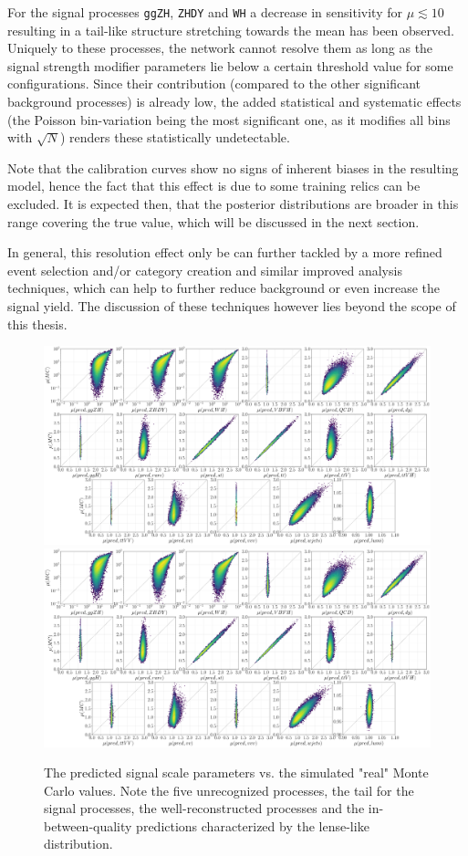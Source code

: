 For the signal processes \texttt{ggZH}, \texttt{ZHDY} and \texttt{WH} a decrease in sensitivity for $\mu\lesssim10$ resulting in a tail-like structure stretching towards the mean has been observed. Uniquely to these processes, the network cannot resolve them as long as the signal strength modifier parameters lie below a certain threshold value for some configurations. Since their contribution (compared to the other significant background processes) is already low, the added statistical and systematic effects (the Poisson bin-variation being the most significant one, as it modifies all bins with $\sqrt{N}$) renders these statistically undetectable.

Note that the calibration curves show no signs of inherent biases in the resulting model, hence the fact that this effect is due to some training relics can be excluded. It is expected then, that the posterior distributions are broader in this range covering the true value, which will be discussed in the next section.

In general, this resolution effect only be can further tackled by a more refined event selection and/or category creation and similar improved analysis techniques, which can help to further reduce background or even increase the signal yield. The discussion of these techniques however lies beyond the scope of this thesis.

\begin{figure}[h!]
	\centering
	\includegraphics[width=\linewidth]{figures/inference/p}
	\includegraphics[width=\linewidth]{figures/inference/p_SN}
	\caption{The predicted signal scale parameters vs. the simulated "real" Monte Carlo values. Note the five unrecognized processes, the tail for the signal processes, the well-reconstructed processes and the in-between-quality predictions characterized by the lense-like distribution.}
	\label{fig:predictions}
\end{figure}

